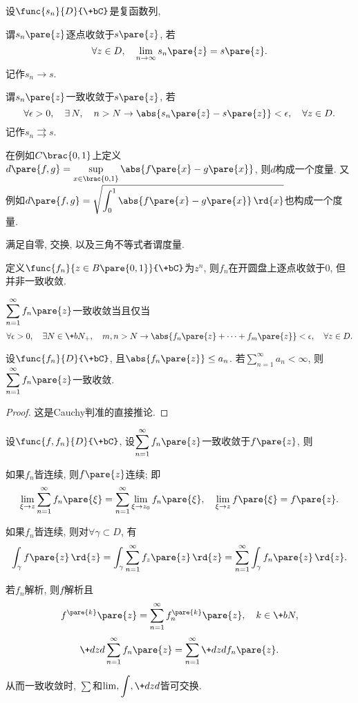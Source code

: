 \documentclass{ctexart}
\begin{document}
\begin{definition}
    设$\func{s_n}{D}{\+bC}$是复函数列,
    \begin{cenum}
        \item 谓$s_n\pare{z}$逐点收敛于$s\pare{z}$, 若
        \[ \forall z\in D,\quad \lim_{n\rightarrow\infty} s_n\pare{z} = s\pare{z}. \]
        记作$s_n \rightarrow s$.
        \item 谓$s_n\pare{z}$一致收敛于$s\pare{z}$, 若
        \[ \forall \epsilon>0,\quad \exists\,N,\quad n>N\rightarrow \abs{s_n\pare{z}-s\pare{z}}<\epsilon,\quad \forall z\in D. \]
        记作$s_n \rightrightarrows s$.
    \end{cenum}
\end{definition}
在例如$C\brac{0,1}$上定义$\displaystyle d\pare{f,g} = \sup_{x\in \brac{0,1}} \abs{f\pare{x} - g\pare{x}}$, 则$d$构成一个度量. 又例如$\displaystyle d\pare{f,g} = \sqrt{\int_0^1 \abs{f\pare{x} - g\pare{x}}\,\rd{x}}$也构成一个度量.
\begin{remark}
    满足自零, 交换, 以及三角不等式者谓度量.
\end{remark}
\begin{ex}
    定义$\func{f_n}{z\in B\pare{0,1}}{\+bC}$为$z^n$, 则$f_n$在开圆盘上逐点收敛于$0$, 但并非一致收敛.
\end{ex}
\begin{theorem}[Cauchy判准]
    $\displaystyle \sum_{n=1}^\infty f_n\pare{z}$一致收敛当且仅当
    \[ \forall \epsilon > 0,\quad \exists N\in \+bN_+,\quad m,n>N\rightarrow \abs{f_n\pare{z} + \cdots + f_m\pare{z}} < \epsilon,\quad \forall z\in D. \]
\end{theorem}
\begin{theorem}[Weierstra\ss 判准]
    设$\func{f_n}{D}{\+bC}$, 且$\abs{f_n\pare{z}} \le a_n$. 若$\displaystyle \sum_{n=1}^\infty a_n <\infty$, 则$\displaystyle \sum_{n=1}^\infty f_n\pare{z}$一致收敛.
\end{theorem}
\begin{proof}
    这是Cauchy判准的直接推论.
\end{proof}
\begin{theorem}[Weierstra\ss 定理]
    \label{thm:weierstrass定理}
    设$\func{f,f_n}{D}{\+bC}$, 设$\displaystyle \sum_{n=1}^\infty f_n\pare{z}$一致收敛于$f\pare{z}$, 则
    \begin{cenum}
        \item 如果$f_n$皆连续, 则$f\pare{z}$连续; 即
        \[ \lim_{\xi \rightarrow z} \sum_{n=1}^\infty f_n\pare{\xi} = \sum_{n=1}^\infty \lim_{\xi \rightarrow z_0} f_n\pare{\xi},\quad \lim_{\xi\rightarrow z} f\pare{\xi} = f\pare{z}. \]
        \item 如果$f_n$皆连续, 则对$\forall \gamma \subset D$, 有
        \[ \int_\gamma f\pare{z}\,\rd{z} = \int_\gamma \sum_{n=1}^\infty f_z\pare{z}\,\rd{z} = \sum_{n=1}^\infty \int_\gamma f_n\pare{z}\,\rd{z}. \]
        \item 若$f_n$解析, 则$f$解析且
        \[ f^{\pare{k}}\pare{z} = \sum_{n=1}^\infty f^{\pare{k}}_n\pare{z},\quad k\in \+bN, \]
        \[ \+dzd{}\sum_{n=1}^\infty f_n\pare{z} = \sum_{n=1}^\infty \+dzd{} f_n\pare{z}. \]
    \end{cenum}
    从而一致收敛时, $\sum$和$\displaystyle \lim, \int, \+dzd{}$皆可交换.
\end{theorem}
\end{document}
